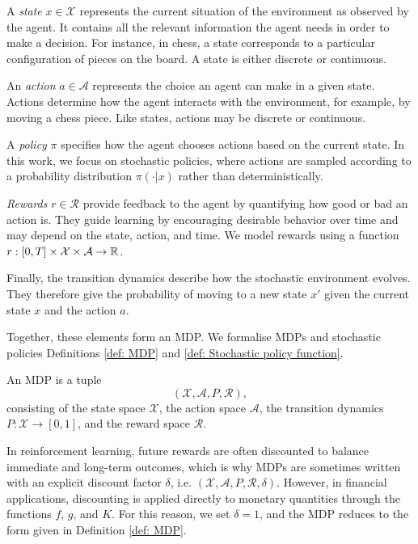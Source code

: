 A \emph{state} $x \in \mathcal{X}$ represents the current situation of the environment as observed by the agent. It contains all the relevant information the agent needs in order to make a decision. For instance, in chess, a state corresponds to a particular configuration of pieces on the board. A state is either discrete or continuous. 

An \emph{action} $a \in \mathcal{A}$ represents the choice an agent can make in a given state. Actions determine how the agent interacts with the environment, for example, by moving a chess piece. Like states, actions may be discrete or continuous.

A \emph{policy} $\pi$ specifies how the agent chooses actions based on the current state. In this work, we focus on stochastic policies, where actions are sampled according to a probability distribution $\pi(\cdot|x)$ rather than deterministically. 

\emph{Rewards} $r \in \mathcal{R}$ provide feedback to the agent by quantifying how good or bad an action is. They guide learning by encouraging desirable behavior over time and may depend on the state, action, and time. We model rewards using a function $r : [0,T] \times \mathcal{X} \times \mathcal{A} \rightarrow \mathbb{R}$. 

Finally, the transition dynamics describe how the stochastic environment evolves. They therefore give the probability of moving to a new state $x'$ given the current state $x$ and the action $a$.

Together, these elements form an MDP. We formalise MDPs and stochastic policies Definitions \ref{def: MDP} and \ref{def: Stochastic policy function}.
\begin{definition}[MDP]
\label{def: MDP}
    An MDP is a tuple 
    \begin{equation*}
        (\mathcal{X}, \mathcal{A}, P, \mathcal{R}),
    \end{equation*}
    consisting of the state space $\mathcal{X}$, the action space $\mathcal{A}$, the transition dynamics $P: \mathcal{X} \rightarrow [0,1]$, and the reward space $\mathcal{R}$.
\end{definition}
\begin{remark}
    In reinforcement learning, future rewards are often discounted to balance immediate and long-term outcomes, which is why MDPs are sometimes written with an explicit discount factor $\delta$, i.e. $(\mathcal{X}, \mathcal{A}, P, \mathcal{R}, \delta)$. However, in financial applications, discounting is applied directly to monetary quantities through the functions $f$, $g$, and $K$. For this reason, we set $\delta = 1$, and the MDP reduces to the form given in Definition \ref{def: MDP}.
\end{remark}

